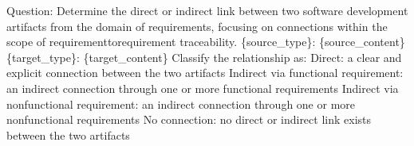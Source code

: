 Question: Determine the direct or indirect link between two software development artifacts from the domain of requirements, focusing on connections within the scope of requirement\-to\-requirement traceability.\newline
\newline
            \{source\_type\}: \textquotesingle{}\textquotesingle{}\textquotesingle{}\{source\_content\}\textquotesingle{}\textquotesingle{}\textquotesingle{}\newline
\newline
            \{target\_type\}: \textquotesingle{}\textquotesingle{}\textquotesingle{}\{target\_content\}\textquotesingle{}\textquotesingle{}\textquotesingle{}\newline
\newline
            Classify the relationship as:\newline
            \- Direct: a clear and explicit connection between the two artifacts\newline
            \- Indirect via functional requirement: an indirect connection through one or more functional requirements\newline
            \- Indirect via non\-functional requirement: an indirect connection through one or more non\-functional requirements\newline
            \- No connection: no direct or indirect link exists between the two artifacts